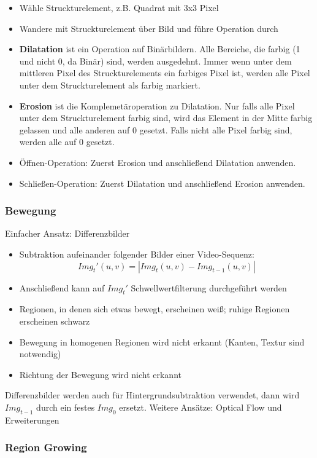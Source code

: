 \begin{itemize}
\item Wähle Struckturelement, z.B. Quadrat mit 3x3 Pixel
\item Wandere mit Struckturelement über Bild und führe Operation durch
\item \textbf{Dilatation} ist ein Operation auf Binärbildern. Alle Bereiche, die farbig (1 und nicht 0, da Binär) sind, werden ausgedehnt. Immer wenn unter dem mittleren Pixel des Struckturelements ein farbiges Pixel ist, werden alle Pixel unter dem Struckturelement als farbig markiert.
\item \textbf{Erosion} ist die Komplemetäroperation zu Dilatation. Nur falls alle Pixel unter dem Struckturelement farbig sind, wird das Element in der Mitte farbig gelassen und alle anderen auf 0 gesetzt. Falls nicht alle Pixel farbig sind, werden alle auf 0 gesetzt.
\item Öffnen-Operation: Zuerst Erosion und anschließend Dilatation anwenden.
\item Schließen-Operation: Zuerst Dilatation und anschließend Erosion anwenden.

\end{itemize}


\subsubsection*{Bewegung}

Einfacher Ansatz: Differenzbilder
\begin{itemize}
\item Subtraktion aufeinander folgender Bilder einer Video-Sequenz: $$Img_t'(u,v) = |Img_t(u,v) - Img_{t-1}(u,v)|$$
\item Anschließend kann auf $Img_t'$ Schwellwertfilterung durchgeführt werden
\item Regionen, in denen sich etwas bewegt, erscheinen weiß; ruhige Regionen erscheinen schwarz
\item Bewegung in homogenen Regionen wird nicht erkannt (Kanten, Textur sind notwendig)
\item Richtung der Bewegung wird nicht erkannt
\end{itemize}
Differenzbilder werden auch für Hintergrundsubtraktion verwendet, dann wird $Img_{t-1}$ durch ein festes $Img_0$ ersetzt. Weitere Ansätze: Optical Flow und Erweiterungen

\subsubsection*{Region Growing}

